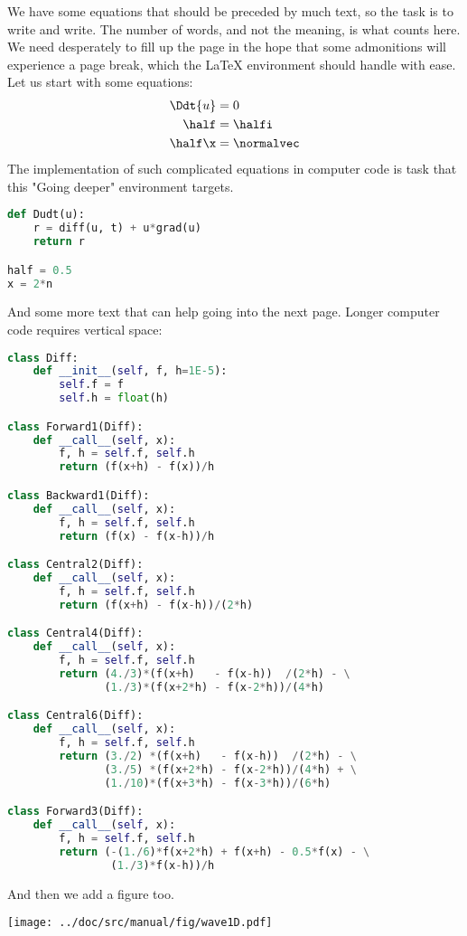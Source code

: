 \documentclass[%
oneside,                 %
final,                   %
10pt]{article}
\newenvironment{noticeshaded}
{\def\FrameCommand{\fboxsep=3mm\colorbox{grayicon_notice_background}}
 \MakeFramed {\advance\hsize-\width \FrameRestore}}{\endMakeFramed}
\newenvironment{notice_grayiconadmon}[1][Notice]{
\begin{noticeshaded}
\noindent
\begin{wrapfigure}{l}{0.07\textwidth}
\vspace{-13pt}
\texttt{[image: latex\_figs/small\_gray\_notice]}
\end{wrapfigure} \textbf{#1}\par
\nobreak\noindent\ignorespaces
}
{
\end{noticeshaded}
}
\begin{document}
\begin{notice_grayiconadmon}
We have some equations that should be preceded by much text, so the
task is to write and write. The number of words, and not the
meaning, is what counts here. We need desperately to fill up the
page in the hope that some admonitions will experience a page break,
which the {\LaTeX} environment should handle with ease.
Let us start with some equations:
\begin{align*}
\Ddt{u} &= 0
\\
\half &= \halfi\\
\half\x &= \normalvec
\end{align*}
The implementation of such complicated equations in computer
code is task that this "Going deeper" environment targets.
\begin{lstlisting}[language=Python,style=simple,xleftmargin=2mm]
def Dudt(u):
    r = diff(u, t) + u*grad(u)
    return r

half = 0.5
x = 2*n

\end{lstlisting}

And some more text that can help going into the next page.
Longer computer code requires vertical space:
\begin{lstlisting}[language=Python,style=simple,xleftmargin=2mm]
class Diff:
    def __init__(self, f, h=1E-5):
        self.f = f
        self.h = float(h)

class Forward1(Diff):
    def __call__(self, x):
        f, h = self.f, self.h
        return (f(x+h) - f(x))/h

class Backward1(Diff):
    def __call__(self, x):
        f, h = self.f, self.h
        return (f(x) - f(x-h))/h

class Central2(Diff):
    def __call__(self, x):
        f, h = self.f, self.h
        return (f(x+h) - f(x-h))/(2*h)

class Central4(Diff):
    def __call__(self, x):
        f, h = self.f, self.h
        return (4./3)*(f(x+h)   - f(x-h))  /(2*h) - \
               (1./3)*(f(x+2*h) - f(x-2*h))/(4*h)

class Central6(Diff):
    def __call__(self, x):
        f, h = self.f, self.h
        return (3./2) *(f(x+h)   - f(x-h))  /(2*h) - \
               (3./5) *(f(x+2*h) - f(x-2*h))/(4*h) + \
               (1./10)*(f(x+3*h) - f(x-3*h))/(6*h)

class Forward3(Diff):
    def __call__(self, x):
        f, h = self.f, self.h
        return (-(1./6)*f(x+2*h) + f(x+h) - 0.5*f(x) - \
                (1./3)*f(x-h))/h

\end{lstlisting}

And then we add a figure too.
\vspace{6mm}
\centerline{\texttt{[image: ../doc/src/manual/fig/wave1D.pdf]}}
\vspace{6mm}
\end{notice_grayiconadmon} %
\end{document}

